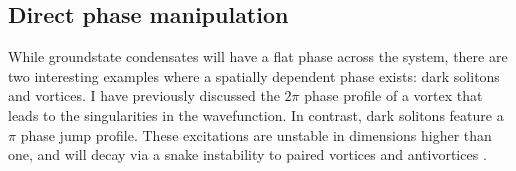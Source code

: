 \subsection{Direct phase manipulation}\label{sec:phase}

While groundstate condensates will have a flat phase across the system, there are two interesting examples where a spatially dependent phase exists: dark solitons and vortices. I have previously discussed the $2\pi$ phase profile of a vortex that leads to the singularities in the wavefunction. In contrast, dark solitons feature a $\pi$ phase jump profile. These excitations are unstable in dimensions higher than one, and will decay via a snake instability to paired vortices and antivortices \cite{BEC:Brand_pra_2002}. %


